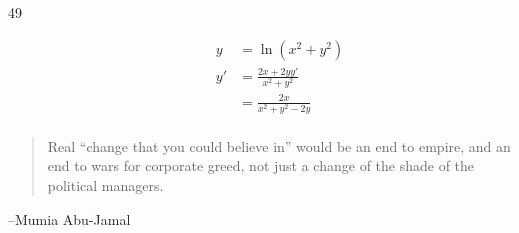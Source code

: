 \documentclass[letterpaper, landscape]{exam}
\begin{document}
\begin{description}
    \item[49] 
      \begin{align*}
        y  & = \ln \left( x^2 + y^2 \right) \\
        y' & = \frac{2x + 2yy'}{x^2 + y^2} \\
           & = \boxed{ \frac{2x}{x^2 + y^2 - 2 y} } \\
      \end{align*}

  \end{description}

  \else
    \vspace{10 cm}
    \begin{quote}
      \begin{em}
        Real ``change that you could believe in'' would be an end to empire,
        and an end to wars for corporate greed, not just a change of the shade
        of the political managers.
      \end{em}
    \end{quote}
    \hspace{2 cm} --Mumia Abu-Jamal
  \fi
\end{document}
